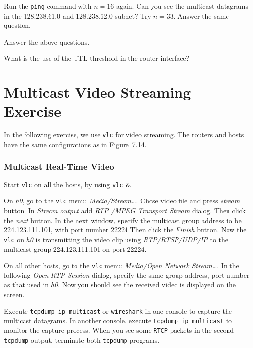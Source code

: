 \documentclass{../UTNetLab}
\begin{document}
    Run the \lstinline{ping} command with $n = 16$ again.
    Can you see the multicast datagrams in the 128.238.61.0 and 128.238.62.0 subnet?
    Try $n = 33$.
    Answer the same question.
    
    \begin{report}
    \item Answer the above questions. 
    
    \item What is the use of the TTL threshold in the router interface?
    \end{report}

\part{Multicast Video Streaming Exercise}
    In the following exercise, we use \lstinline{vlc} for video streaming.
    The routers and hosts have the same configurations as in \hyperref[fig:7.14]{Figure~7.14}.

\section{Multicast Real-Time Video}
    Start \lstinline{vlc} on all the hosts, by using \lstinline{vlc &}. 

    On \textit{h0}, go to the \lstinline{vlc} menu: \textit{Media/Stream\ldots }. Chose video file  and press \textit{stream} button. In \textit{Stream output} add \textit{RTP /MPEG Transport Stream} dialog.
    Then click the \textit{next} button.
    In the next window, specify the multicast group address to be {224.123.111.101}, with port number {22224} %
    Then click the \textit{Finish} button.
    Now the \lstinline{vlc} on \textit{h0} is transmitting the video clip using \textit{RTP/RTSP/UDP/IP} to the multicast group {224.123.111.101} on port {22224}. 

    On all other hosts, go to the \lstinline{vlc} menu: \textit{Media/Open Network Stream\ldots}. In the following \textit{Open RTP Session} dialog, specify the same group address, port number as that used in \textit{h0}.%
    Now you should see the received video is displayed on the screen. 

    Execute \lstinline{tcpdump ip multicast} or \lstinline{wireshark} in one console to capture the multicast datagrams.
    In another console, execute \lstinline{tcpdump ip multicast} to monitor the capture process.
    When you see some \texttt{RTCP} packets in the second \lstinline{tcpdump} output, terminate both \lstinline{tcpdump} programs. 
\end{document}
